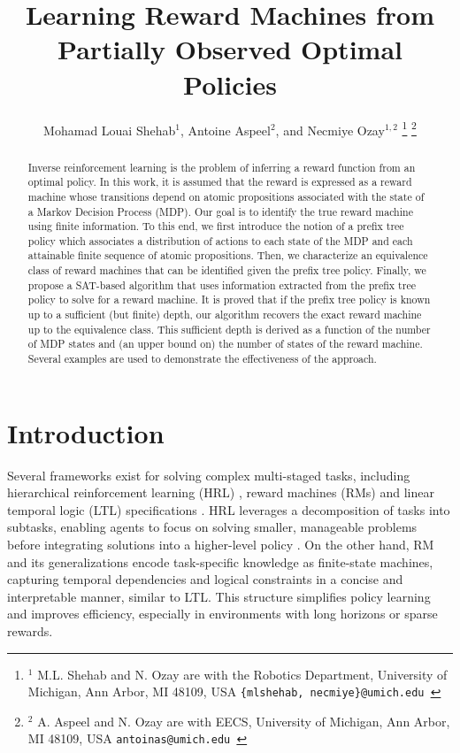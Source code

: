 \documentclass[letterpaper, 10 pt, conference]{ieeeconf}
\title{\LARGE \bf
Learning Reward Machines from Partially Observed Optimal Policies
}
\author{Mohamad Louai Shehab$^{1}$, Antoine Aspeel$^{2}$, and Necmiye Ozay$^{1,2}$
\thanks{$^{1}$ M.L. Shehab and N. Ozay are with the Robotics Department, University of Michigan, Ann Arbor, MI 48109, USA {\tt\small \{mlshehab, necmiye\}@umich.edu }}
\thanks{$^{2}$ A. Aspeel and N. Ozay are with EECS, University of Michigan, Ann Arbor, MI 48109, USA {\tt\small antoinas@umich.edu }}
}
\begin{document}
\maketitle
\thispagestyle{empty}
\pagestyle{empty}

\begin{abstract}%
Inverse reinforcement learning is the problem of inferring a reward function from an optimal policy. In this work, it is assumed that the reward is expressed as a reward machine whose transitions depend on atomic propositions associated with the state of a Markov Decision Process (MDP). Our goal is to identify the true reward machine using finite information. To this end, we first introduce the notion of a prefix tree policy which associates a distribution of actions to each state of the MDP and each attainable finite sequence of atomic propositions. Then, we characterize an equivalence class of reward machines that can be identified given the prefix tree policy. Finally, we propose a SAT-based algorithm that uses information extracted from the prefix tree policy to solve for a reward machine. It is proved that if the prefix tree policy is known up to a sufficient (but finite) depth, our algorithm recovers the exact reward machine up to the equivalence class. This sufficient depth is derived as a function of the number of MDP states and (an upper bound on) the number of states of the reward machine. Several examples are used to demonstrate the effectiveness of the approach.
\end{abstract}

\section{Introduction} 
Several frameworks exist for solving complex multi-staged tasks, including hierarchical reinforcement learning (HRL) \cite{pateria2021hierarchical}, reward machines (RMs) \cite{icarte2018using} and linear temporal logic (LTL) specifications \cite{chou2020explaining,vaezipoor2021ltl2action}. HRL leverages a decomposition of tasks into subtasks, enabling agents to focus on solving smaller, manageable problems before integrating solutions into a higher-level policy \cite{sutton1999between}. On the other hand, RM and its generalizations \cite{corazza2022reinforcement} encode task-specific knowledge as finite-state machines, capturing temporal dependencies and logical constraints in a concise and interpretable manner, similar to LTL. This structure simplifies policy learning and improves efficiency, especially in environments with long horizons or sparse rewards. 
\end{document}
